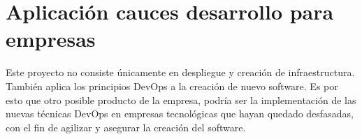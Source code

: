 \section{Aplicación cauces desarrollo para empresas}
\begin{text}
        Este proyecto no consiste únicamente en despliegue y creación de infraestructura. También aplica los principios DevOps a la creación de nuevo software. Es por esto que otro posible producto de la empresa, podría ser la implementación de las nuevas técnicas DevOps en empresas tecnológicas que hayan quedado desfasadas, con el fin de agilizar y asegurar la creación del software.
\end{text}